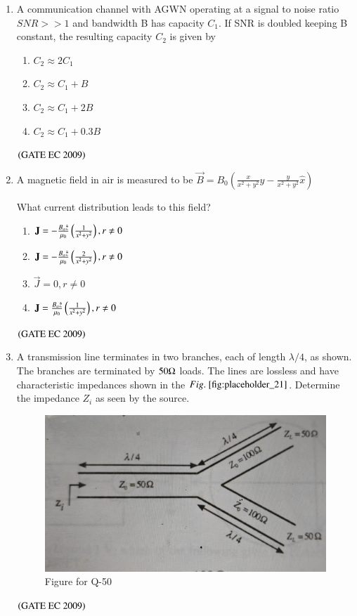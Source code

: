 \documentclass[journal,12pt,onecolumn]{IEEEtran}
\theoremstyle{remark}
\begin{document}
\begin{enumerate}
\item A communication channel with AGWN operating at a signal to noise ratio $SNR>>1$ and bandwidth B has capacity $C_1$. If SNR is doubled keeping B constant, the resulting capacity $C_2$ is given by 
\begin{enumerate}
        \item $C_2 \approx 2 C_1$
        \item $C_2 \approx  C_1+B$
        \item $C_2 \approx  C_1 + 2B$
        \item $C_2 \approx  C_1+ 0.3B$
\end{enumerate}
\hfill $\brak{\text{GATE EC 2009}}$

\item A magnetic field in air is measured to be $\vec{B} = B_0(\frac{x}{x^2+y^2} \hat{y} - \frac{y}{x^2+y^2} \hat{x})$

What current distribution leads to this field? 
\begin{enumerate}
        \item $\vec{J}= -\frac{B_o \hat{z}}{\mu_0} \brak{ \frac{1}{x^2 + y^2}}, r \neq 0$
        \item $\vec{J}= -\frac{B_o \hat{z}}{\mu_0} \brak{ \frac{2}{x^2 + y^2}}, r \neq 0$
        \item $\vec{J}= 0, r\neq 0$
        \item $\vec{J}= \frac{B_o \hat{z}}{\mu_0} \brak{ \frac{1}{x^2 + y^2}}, r \neq 0$
\end{enumerate}
\hfill $\brak{\text{GATE EC 2009}}$

\item A transmission line terminates in two branches, each of length $\lambda/4$, as shown. The branches are terminated by $50 \ohm$ loads. The lines are lossless and have characteristic impedances shown in the $\figref{fig:placeholder_21}$. Determine the impedance $Z_i$ as seen by the source.
\begin{figure}[H]
    \centering
    \includegraphics[width=0.5\columnwidth]{figs/fig_21.jpg}
    \caption{\centering Figure for Q-50}
    \label{fig:placeholder_20}
\end{figure}
\begin{enumerate}
\end{enumerate}
\hfill $\brak{\text{GATE EC 2009}}$


\end{enumerate}
\end{document}
